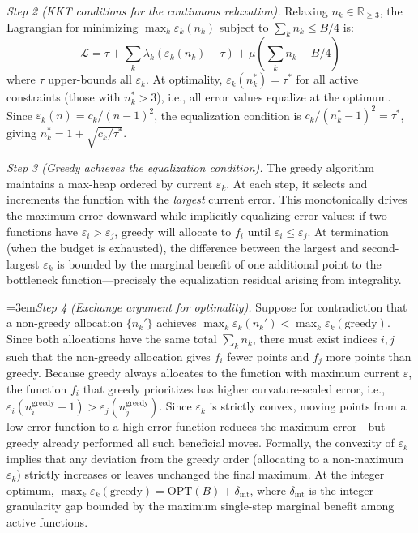 \documentclass[journal,onecolumn]{IEEEtran}
\begin{document}
\noindent\textit{Step 2 (KKT conditions for the continuous relaxation).}
Relaxing $n_k \in \mathbb{R}_{\geq 3}$, the Lagrangian for minimizing
$\max_k \varepsilon_k(n_k)$ subject to $\sum_k n_k \leq B/4$ is:
\begin{equation}
\mathcal{L} = \tau + \sum_k \lambda_k(\varepsilon_k(n_k) - \tau)
+ \mu\left(\sum_k n_k - B/4\right)
\label{eq:lagrangian}
\end{equation}
where $\tau$ upper-bounds all $\varepsilon_k$. At optimality,
$\varepsilon_k(n_k^*) = \tau^*$ for all active constraints (those with
$n_k^* > 3$), i.e., all error values equalize at the optimum. Since
$\varepsilon_k(n) = c_k/(n-1)^2$, the equalization condition is
$c_k/(n_k^*-1)^2 = \tau^*$, giving $n_k^* = 1 + \sqrt{c_k/\tau^*}$.

\noindent\textit{Step 3 (Greedy achieves the equalization condition).}
The greedy algorithm maintains a max-heap ordered by current
$\varepsilon_k$. At each step, it selects and increments the function
with the \textit{largest} current error. This monotonically drives the
maximum error downward while implicitly equalizing error values: if
two functions have $\varepsilon_i > \varepsilon_j$, greedy will allocate
to $f_i$ until $\varepsilon_i \leq \varepsilon_j$. At termination (when
the budget is exhausted), the difference between the largest and
second-largest $\varepsilon_k$ is bounded by the marginal benefit of
one additional point to the bottleneck function---precisely the
equalization residual arising from integrality.

\begingroup{}\emergencystretch=3em\noindent\textit{Step 4 (Exchange argument for optimality).}
Suppose for contradiction that a non-greedy allocation
$\{n_k'\}$ achieves\hspace{0pt} $\max_k \varepsilon_k(n_k') < \max_k
\varepsilon_k(\text{greedy})$. Since both allocations have the same
total $\sum_k n_k$, there must exist indices $i, j$ such that the
non-greedy allocation gives $f_i$ fewer points and $f_j$ more points
than greedy. Because greedy always allocates to the function with
maximum current $\varepsilon$, the function $f_i$ that greedy
prioritizes has higher curvature-scaled error, i.e.,
$\varepsilon_i(n_i^{\text{greedy}}-1) > \varepsilon_j(n_j^{\text{greedy}})$.
Since $\varepsilon_k$ is strictly convex, moving points from a
low-error function to a high-error function reduces the maximum
error---but greedy already performed all such beneficial moves.
Formally, the convexity of $\varepsilon_k$ implies that any deviation
from the greedy order (allocating to a non-maximum $\varepsilon_k$)
strictly increases or leaves unchanged the final maximum. At the
integer optimum, $\max_k \varepsilon_k(\text{greedy}) = \text{OPT}(B)
+ \delta_{\text{int}}$, where $\delta_{\text{int}}$ is the
integer-granularity gap bounded by the maximum single-step marginal
benefit among active functions.\par\endgroup
\end{document}
